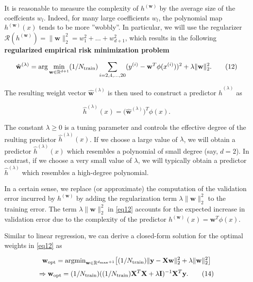 \documentclass[11pt]{article}
\begin{document}
It is reasonable to measure the complexity of \(h^{(\mathbf{w})}\) by
the average size of the coeffcients \(w_{l}\). Indeed, for many large
coefficients \(w_{l}\), the polynomial map \(h^{(\mathbf{w})}(x)\) tends
to be more ''wobbly''. In particular, we will use the regularizer
\(\mathcal{R}(h^{(\mathbf{w})}) = \| \mathbf{w} \|^{2}_{2} = w_{1}^{2}+\ldots+w_{d+1}^{2}\),
which results in the following \textbf{regularized empirical risk
minimization problem}

\begin{equation}
\hat{\mathbf{w}}^{(\lambda)} = {\rm arg} \min\limits_{\mathbf{w} \in \mathbb{R}^{d+1}} (1/N_{\rm train}) \sum_{i=2,4,\ldots,20} (y^{(i)} - \mathbf{w}^{T} \phi(x^{(i)}))^{2}+\lambda \| \mathbf{w} \|^{2}_{2}.
\label{eq12}
\tag{12}
\end{equation}

The resulting weight vector \(\hat{\mathbf{w}}^{(\lambda)}\) is then
used to construct a predictor \(\hat{h}^{(\lambda)}\) as

\begin{equation} 
\hat{h}^{(\lambda)}(x) = \big( \hat{\mathbf{w}}^{(\lambda)}\big)^{T} \phi(x).
\label{eq13}
\tag{13}
\end{equation}

The constant \(\lambda \geq 0\) is a tuning parameter and controls the
effective degree of the rsulting predictor \(\hat{h}^{(\lambda)}(x)\).
If we choose a large value of \(\lambda\), we will obtain a predictor
\(\hat{h}^{(\lambda)}(x)\) which resembles a polynomial of small degree
(say, \(d=2\)). In contrast, if we choose a very small value of
\(\lambda\), we will typically obtain a predictor
\(\hat{h}^{(\lambda)}\) which resembles a high-degree polynomial.

In a certain sense, we replace (or approximate) the computation of the
validation error incurred by \(h^{(\mathbf{w})}\) by adding the
regularization term \(\lambda \| \mathbf{w} \|^{2}_{2}\) to the training
error. The term \(\lambda \| \mathbf{w} \|^{2}_{2}\) in \eqref{eq12}
accounts for the expected increase in validation error due to the
complexity of the predictor
\(h^{(\mathbf{w})}(x)= \mathbf{w}^{T} \phi(x)\).

Similar to linear regression, we can derive a closed-form solution for
the optimal weights in \eqref{eq12} as

\begin{equation}
\nonumber
\mathbf{w}_{\rm opt} = \text{argmin}_{\mathbf{w} \in  \mathbb{R}^{d_{\rm max}+1}} \big[(1/N_{\rm train}) \|\mathbf{y} - \mathbf{X} \mathbf{w} \|^{2}_{2} + \lambda \| \mathbf{w} \|^{2}_{2}\big]
\end{equation}\begin{equation} 
\Rightarrow\mathbf{w}_{\rm opt} = (1/N_{\rm train})( (1/N_{\rm train}) \mathbf{X}^{T} \mathbf{X} + \lambda \mathbf{I})^{-1} \mathbf{X}^{T} \mathbf{y}.
\label{eq14}
\tag{14}
\end{equation}
\end{document}
